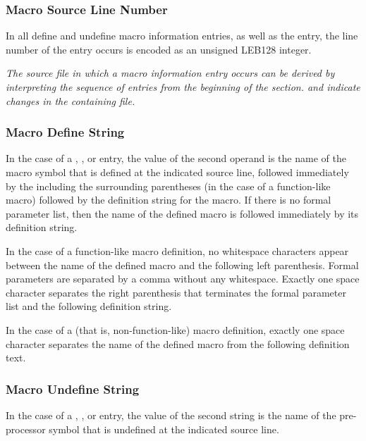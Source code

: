 \subsubsection{Macro Source Line Number}
\label{char:macrosourcelinenumber}
In all define and undefine macro information entries,
as well as the \DWMACROstartfile{} entry,
the line number of the entry occurs is encoded as an
unsigned LEB128 integer.

\textit{The source file in which a macro information entry occurs
can be derived by interpreting the sequence of entries from the
beginning of the \dotdebugmacro{} section. \DWMACROstartfile{} and 
\DWMACROendfile{} indicate changes in the containing file.}

\subsubsection{Macro Define String}
\label{chap:macrodefinestring}
In the case of a 
\DWMACROdefine{},
\DWMACROdefinestrp{},
\DWMACROdefinestrx{} or
\DWMACROdefinesup{}
entry, the value of the
second operand is the name of the macro symbol that is defined
at the indicated source line, followed immediately by the 
including the surrounding parentheses (in
the case of a function-like macro) followed by the definition
string for the macro. If there is no formal parameter list,
then the name of the defined macro is followed immediately by
its definition string.

In the case of a function-like macro definition, no whitespace
characters appear between the name of the defined
macro and the following left parenthesis. Formal parameters
are separated by a comma without any whitespace.
Exactly one space
character separates the right parenthesis that terminates
the formal parameter list and the following definition string.

In the case of a  (that is, non-function-like) macro
definition, exactly one space character separates the
name of the defined macro from the following definition text.

\subsubsection{Macro Undefine String}
\label{chap:macroundefinestring}
In the case of a 
\DWMACROundef{},
\DWMACROundefstrp{},
\DWMACROundefstrx{} or
\DWMACROundefsup{}
entry, the value of the second string is the name of the pre-processor
symbol that is undefined at the indicated source line.

